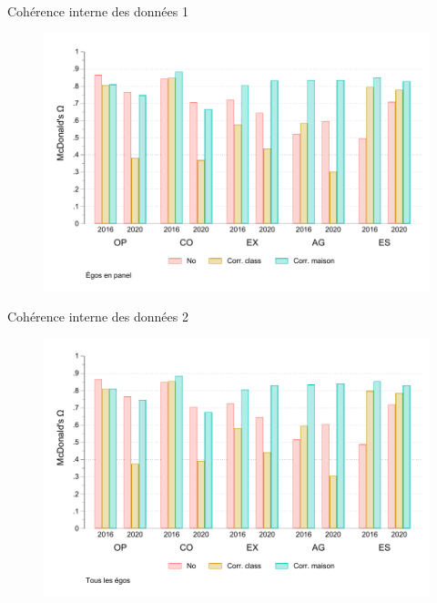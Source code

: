 \documentclass[aspectratio=169]{beamer}
\begin{document}
\begin{frame}[plain, shrink=2]{Cohérence interne des données 1}
\begin{figure}[htpb]
\centering
\includegraphics[scale=0.9]{INPUT/omega_panel.pdf}
\end{figure}
 \end{frame}



\begin{frame}[plain, shrink=2]{Cohérence interne des données 2}
\begin{figure}[htpb]
\centering
\includegraphics[scale=0.9]{INPUT/omega_tot.pdf}
\end{figure}
 \end{frame}
\end{document}
